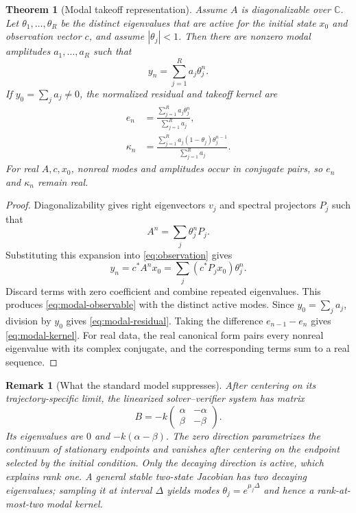 \documentclass[10pt,twocolumn]{article}
\newtheorem{theorem}{Theorem}
\newtheorem{remark}{Remark}
\newcommand{\CC}{\mathbb{C}}
\begin{document}
\begin{theorem}[Modal takeoff representation]\label{thm:modal}
Assume $A$ is diagonalizable over $\CC$.  Let
$\theta_1,\ldots,\theta_R$ be the distinct eigenvalues that are active for the
initial state $x_0$ and observation vector $c$, and assume
$|\theta_j|<1$.  Then there are nonzero modal amplitudes
$a_1,\ldots,a_R$ such that
\begin{equation}\label{eq:modal-observable}
 y_n=\sum_{j=1}^{R}a_j\theta_j^n.
\end{equation}
If $y_0=\sum_j a_j\ne0$, the normalized residual and takeoff kernel are
\begin{align}
 e_n&=\frac{\sum_{j=1}^{R}a_j\theta_j^n}
 {\sum_{j=1}^{R}a_j},\label{eq:modal-residual}\\
 \kappa_n&=\frac{\sum_{j=1}^{R}a_j(1-\theta_j)
 \theta_j^{n-1}}{\sum_{j=1}^{R}a_j}.
 \label{eq:modal-kernel}
\end{align}
For real $A,c,x_0$, nonreal modes and amplitudes occur in conjugate pairs, so
$e_n$ and $\kappa_n$ remain real.
\end{theorem}

\begin{proof}
Diagonalizability gives right eigenvectors $v_j$ and spectral projectors
$P_j$ such that
\[
 A^n=\sum_j\theta_j^nP_j.
\]
Substituting this expansion into \eqref{eq:observation} gives
\[
 y_n=c^*A^nx_0
 =\sum_j(c^*P_jx_0)\theta_j^n.
\]
Discard terms with zero coefficient and combine repeated eigenvalues.  This
produces \eqref{eq:modal-observable} with the distinct active modes.  Since
$y_0=\sum_j a_j$, division by $y_0$ gives
\eqref{eq:modal-residual}.  Taking the difference $e_{n-1}-e_n$ gives
\eqref{eq:modal-kernel}.  For real data, the real canonical form pairs every
nonreal eigenvalue with its complex conjugate, and the corresponding terms sum
to a real sequence.
\end{proof}

\begin{remark}[What the standard model suppresses]
After centering on its trajectory-specific limit, the linearized
solver--verifier system has matrix
\begin{equation}\label{eq:sun-matrix}
 B=-k
 \begin{pmatrix}
  \alpha&-\alpha\\
  \beta&-\beta
 \end{pmatrix}.
\end{equation}
Its eigenvalues are $0$ and $-k(\alpha-\beta)$.  The zero direction parametrizes
the continuum of stationary endpoints and vanishes after centering on the
endpoint selected by the initial condition.  Only the decaying direction is
active, which explains rank one.  A general stable two-state Jacobian has two
decaying eigenvalues; sampling it at interval $\Delta$ yields modes
$\theta_j=e^{\mu_j\Delta}$ and hence a rank-at-most-two modal kernel.
\end{remark}
\end{document}
